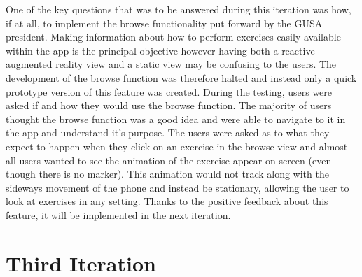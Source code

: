 \documentclass{l4proj}
\begin{document}
One of the key questions that was to be answered during this iteration was how, if at all, to implement the browse functionality put forward by the GUSA president. Making information about how to perform exercises easily available within the app is the principal objective however having both a reactive augmented reality view and a static view may be confusing to the users. The development of the browse  function was therefore halted and instead only a quick prototype version of this feature was created. During the testing, users were asked if and how they would use the browse function. The majority of users thought the browse function was a good idea and were able to navigate to it in the app and understand it's purpose. The users were asked as to what they expect to happen when they click on an exercise in the browse view and almost all users wanted to see the animation of the exercise appear on screen (even though there is no marker). This animation would not track along with the sideways movement of the phone and instead be stationary, allowing the user to look at exercises in any setting. Thanks to the positive feedback about this feature, it will be implemented in the next iteration.

\section{Third Iteration}
\end{document}

